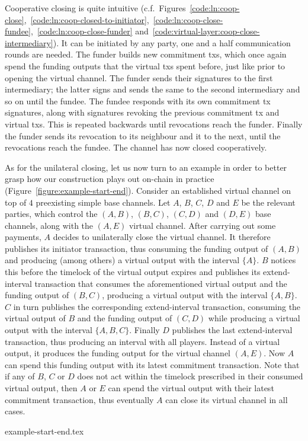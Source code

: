   Cooperative closing is quite intuitive (c.f.\
  Figures~\ref{code:ln:coop-close},~\ref{code:ln:coop-closed-to-initiator},~\ref{code:ln:coop-close-fundee},~\ref{code:ln:coop-close-funder}
  and~\ref{code:virtual-layer:coop-close-intermediary}). It can be initiated by
  any party, one and a half communication rounds are needed. The funder builds
  new commitment txs, which once again spend the funding outputs that the
  virtual txs spent before, just like prior to opening the virtual channel. The
  funder sends
  their signatures to the first intermediary; the latter signs and sends the
  same to the second intermediary and so on until the fundee. The fundee
  responds with its own commitment tx signatures, along with signatures revoking
  the previous commitment tx and virtual txs. This is repeated backwards until
  revocations reach the funder. Finally the funder sends its revocation to its
  neighbour and it to the next, until the revocations reach the fundee. The
  channel has now closed cooperatively.

  As for the unilateral closing, let us now turn to an example in order to
  better grasp how our construction plays out on-chain in practice
  (Figure~\ref{figure:example-start-end}). Consider an
  established virtual channel on top of $4$ preexisting simple base channels.
  Let $A$, $B$, $C$, $D$ and $E$ be the relevant parties, which control the $(A,
  B)$, $(B, C)$, $(C, D)$ and $(D, E)$ base channels, along with the $(A, E)$
  virtual channel. After carrying out some payments, $A$ decides to unilaterally
  close the virtual channel. It therefore publishes its initiator transaction,
  thus consuming the funding output of $(A, B)$ and producing (among others) a
  virtual output with the interval $\{A\}$. $B$ notices this before the timelock
  of the virtual output expires and publishes its extend-interval
  transaction that consumes the aforementioned virtual output and the funding
  output of $(B, C)$, producing a virtual output with the interval $\{A, B\}$.
  $C$ in turn publishes the corresponding extend-interval transaction, consuming
  the virtual output of $B$ and the funding output of $(C, D)$ while producing a
  virtual output with the interval $\{A, B, C\}$. Finally $D$ publishes the last
  extend-interval transaction, thus producing an interval with all players.
  Instead of a virtual output, it produces the funding output for the virtual
  channel $(A, E)$. Now $A$ can spend this funding output with its latest
  commitment transaction. Note that if any of $B$, $C$ or $D$ does
  not act within the timelock prescribed in their consumed virtual output, then
  $A$ or $E$ can spend the virtual output with their latest commitment
  transaction, thus eventually $A$ can close its virtual channel in all cases.

  \begin{figure*}
    {example-start-end.tex}
    \caption{$4$ simple channels supporting a virtual. $A$ initiates the closing
    procedure and no party is negligent. Virtual outputs are marked with their
    interval.}
    \label{figure:example-start-end}
  \end{figure*}
